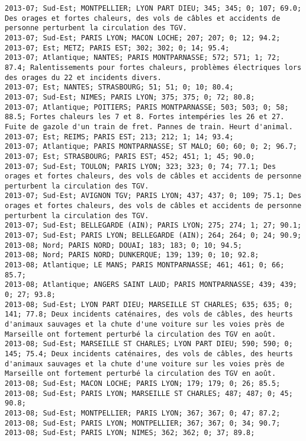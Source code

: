 \documentclass{article}
\begin{document}
\begin{Verbatim}[commandchars=\\\{\}]
2013-07; Sud-Est; MONTPELLIER; LYON PART DIEU; 345; 345; 0; 107; 69.0; Des orages et fortes chaleurs, des vols de câbles et accidents de personne perturbent la circulation des TGV.
2013-07; Sud-Est; PARIS LYON; MACON LOCHE; 207; 207; 0; 12; 94.2; 
2013-07; Est; METZ; PARIS EST; 302; 302; 0; 14; 95.4; 
2013-07; Atlantique; NANTES; PARIS MONTPARNASSE; 572; 571; 1; 72; 87.4; Ralentissements pour fortes chaleurs, problèmes électriques lors des orages du 22 et incidents divers.
2013-07; Est; NANTES; STRASBOURG; 51; 51; 0; 10; 80.4; 
2013-07; Sud-Est; NIMES; PARIS LYON; 375; 375; 0; 72; 80.8; 
2013-07; Atlantique; POITIERS; PARIS MONTPARNASSE; 503; 503; 0; 58; 88.5; Fortes chaleurs les 7 et 8. Fortes intempéries les 26 et 27. Fuite de gazole d'un train de fret. Pannes de train. Heurt d'animal.
2013-07; Est; REIMS; PARIS EST; 213; 212; 1; 14; 93.4; 
2013-07; Atlantique; PARIS MONTPARNASSE; ST MALO; 60; 60; 0; 2; 96.7; 
2013-07; Est; STRASBOURG; PARIS EST; 452; 451; 1; 45; 90.0; 
2013-07; Sud-Est; TOULON; PARIS LYON; 323; 323; 0; 74; 77.1; Des orages et fortes chaleurs, des vols de câbles et accidents de personne perturbent la circulation des TGV.
2013-07; Sud-Est; AVIGNON TGV; PARIS LYON; 437; 437; 0; 109; 75.1; Des orages et fortes chaleurs, des vols de câbles et accidents de personne perturbent la circulation des TGV.
2013-07; Sud-Est; BELLEGARDE (AIN); PARIS LYON; 275; 274; 1; 27; 90.1; 
2013-07; Sud-Est; PARIS LYON; BELLEGARDE (AIN); 264; 264; 0; 24; 90.9; 
2013-08; Nord; PARIS NORD; DOUAI; 183; 183; 0; 10; 94.5; 
2013-08; Nord; PARIS NORD; DUNKERQUE; 139; 139; 0; 10; 92.8; 
2013-08; Atlantique; LE MANS; PARIS MONTPARNASSE; 461; 461; 0; 66; 85.7; 
2013-08; Atlantique; ANGERS SAINT LAUD; PARIS MONTPARNASSE; 439; 439; 0; 27; 93.8; 
2013-08; Sud-Est; LYON PART DIEU; MARSEILLE ST CHARLES; 635; 635; 0; 141; 77.8; Deux incidents caténaires, des vols de câbles, des heurts d'animaux sauvages et la chute d'une voiture sur les voies près de Marseille ont fortement perturbé la circulation des TGV en août.
2013-08; Sud-Est; MARSEILLE ST CHARLES; LYON PART DIEU; 590; 590; 0; 145; 75.4; Deux incidents caténaires, des vols de câbles, des heurts d'animaux sauvages et la chute d'une voiture sur les voies près de Marseille ont fortement perturbé la circulation des TGV en août.
2013-08; Sud-Est; MACON LOCHE; PARIS LYON; 179; 179; 0; 26; 85.5; 
2013-08; Sud-Est; PARIS LYON; MARSEILLE ST CHARLES; 487; 487; 0; 45; 90.8; 
2013-08; Sud-Est; MONTPELLIER; PARIS LYON; 367; 367; 0; 47; 87.2; 
2013-08; Sud-Est; PARIS LYON; MONTPELLIER; 367; 367; 0; 34; 90.7; 
2013-08; Sud-Est; PARIS LYON; NIMES; 362; 362; 0; 37; 89.8; 

\end{Verbatim}
\end{document}
